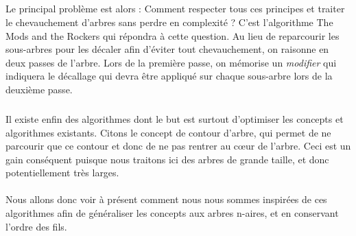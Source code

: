 \subparagraph{}Le principal problème est alors : Comment respecter tous ces principes et traiter le chevauchement d'arbres sans perdre en complexité ? C'est l'algorithme The Mods and the Rockers qui répondra à cette question. Au lieu de reparcourir les sous-arbres pour les décaler afin d'éviter tout chevauchement, on raisonne en deux passes de l'arbre. Lors de la première passe, on mémorise un \emph{modifier} qui indiquera le décallage qui devra être appliqué sur chaque sous-arbre lors de la deuxième passe.

\subparagraph{}Il existe enfin des algorithmes dont le but est surtout d'optimiser les concepts et algorithmes existants. Citons le concept de contour d'arbre, qui permet de ne parcourir que ce contour et donc de ne pas rentrer au c\oe{}ur de l'arbre. Ceci est un gain conséquent puisque nous traitons ici des arbres de grande taille, et donc potentiellement très larges.

\paragraph{}Nous allons donc voir à présent comment nous nous sommes inspirées de ces algorithmes afin de généraliser les concepts aux arbres n-aires, et en conservant l'ordre des fils.